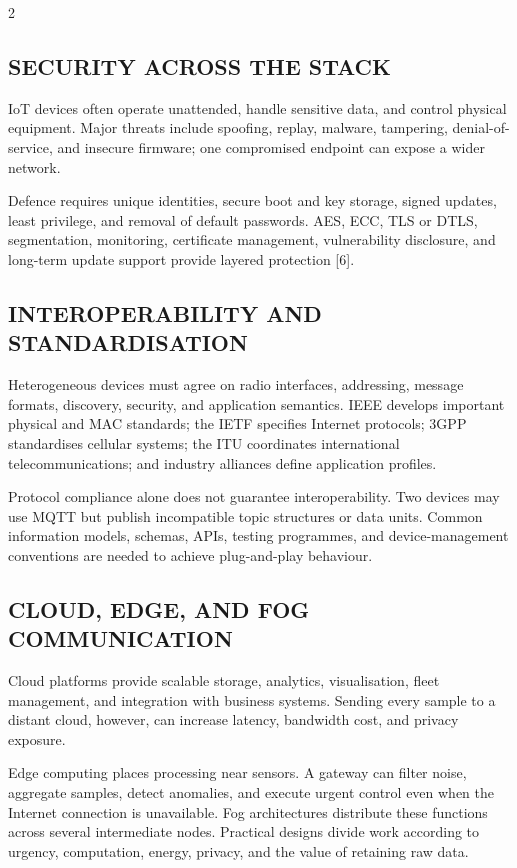 \begin{multicols}{2}
  \subsection*{\centering\uppercase{Security Across the Stack}}
  {\justifying
    IoT devices often operate unattended, handle sensitive data, and control physical equipment. Major threats include spoofing, replay, malware, tampering, denial-of-service, and insecure firmware; one compromised endpoint can expose a wider network.

    \noindent
    Defence requires unique identities, secure boot and key storage, signed updates, least privilege, and removal of default passwords. AES, ECC, TLS or DTLS, segmentation, monitoring, certificate management, vulnerability disclosure, and long-term update support provide layered protection [6].\par
  }

  \subsection*{\centering\uppercase{Interoperability and Standardisation}}
  Heterogeneous devices must agree on radio interfaces, addressing, message formats, discovery, security, and application semantics. IEEE develops important physical and MAC standards; the IETF specifies Internet protocols; 3GPP standardises cellular systems; the ITU coordinates international telecommunications; and industry alliances define application profiles.

  \noindent
  Protocol compliance alone does not guarantee interoperability. Two devices may use MQTT but publish incompatible topic structures or data units. Common information models, schemas, APIs, testing programmes, and device-management conventions are needed to achieve plug-and-play behaviour.

  \subsection*{\centering\uppercase{Cloud, Edge, and Fog Communication}}
  Cloud platforms provide scalable storage, analytics, visualisation, fleet management, and integration with business systems. Sending every sample to a distant cloud, however, can increase latency, bandwidth cost, and privacy exposure.

  \noindent
  Edge computing places processing near sensors. A gateway can filter noise, aggregate samples, detect anomalies, and execute urgent control even when the Internet connection is unavailable. Fog architectures distribute these functions across several intermediate nodes. Practical designs divide work according to urgency, computation, energy, privacy, and the value of retaining raw data.


\end{multicols}
